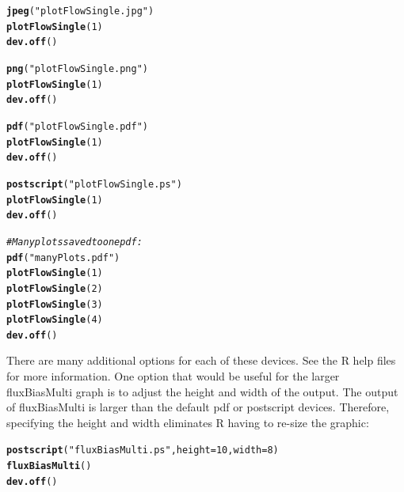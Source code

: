 \documentclass[a4paper,11pt]{article}\usepackage[]{graphicx}\usepackage[]{color}
\makeatletter
\newcommand{\hlnum}[1]{\textcolor[rgb]{0.686,0.059,0.569}{#1}}%
\newcommand{\hlstr}[1]{\textcolor[rgb]{0.192,0.494,0.8}{#1}}%
\newcommand{\hlcom}[1]{\textcolor[rgb]{0.678,0.584,0.686}{\textit{#1}}}%
\newcommand{\hlstd}[1]{\textcolor[rgb]{0.345,0.345,0.345}{#1}}%
\newcommand{\hlkwc}[1]{\textcolor[rgb]{0.333,0.667,0.333}{#1}}%
\newcommand{\hlkwd}[1]{\textcolor[rgb]{0.737,0.353,0.396}{\textbf{#1}}}%
\newenvironment{kframe}{%
 \def\at@end@of@kframe{}%
 \ifinner\ifhmode%
  \def\at@end@of@kframe{\end{minipage}}%
  \begin{minipage}{\columnwidth}%
 \fi\fi%
 \def\FrameCommand##1{\hskip\@totalleftmargin \hskip-\fboxsep
 \colorbox{shadecolor}{##1}\hskip-\fboxsep
     \hskip-\linewidth \hskip-\@totalleftmargin \hskip\columnwidth}%
 \MakeFramed {\advance\hsize-\width
   \@totalleftmargin\z@ \linewidth\hsize
   \@setminipage}}%
 {\par\unskip\endMakeFramed%
 \at@end@of@kframe}
\newenvironment{knitrout}{}{} %
\makeatother
\begin{document}
\begin{knitrout}
\color{fgcolor}\begin{kframe}
\begin{alltt}
\hlkwd{jpeg}\hlstd{(}\hlstr{"plotFlowSingle.jpg"}\hlstd{)}
\hlkwd{plotFlowSingle}\hlstd{(}\hlnum{1}\hlstd{)}
\hlkwd{dev.off}\hlstd{()}

\hlkwd{png}\hlstd{(}\hlstr{"plotFlowSingle.png"}\hlstd{)}
\hlkwd{plotFlowSingle}\hlstd{(}\hlnum{1}\hlstd{)}
\hlkwd{dev.off}\hlstd{()}

\hlkwd{pdf}\hlstd{(}\hlstr{"plotFlowSingle.pdf"}\hlstd{)}
\hlkwd{plotFlowSingle}\hlstd{(}\hlnum{1}\hlstd{)}
\hlkwd{dev.off}\hlstd{()}

\hlkwd{postscript}\hlstd{(}\hlstr{"plotFlowSingle.ps"}\hlstd{)}
\hlkwd{plotFlowSingle}\hlstd{(}\hlnum{1}\hlstd{)}
\hlkwd{dev.off}\hlstd{()}

\hlcom{#Many plots saved to one pdf:}
\hlkwd{pdf}\hlstd{(}\hlstr{"manyPlots.pdf"}\hlstd{)}
\hlkwd{plotFlowSingle}\hlstd{(}\hlnum{1}\hlstd{)}
\hlkwd{plotFlowSingle}\hlstd{(}\hlnum{2}\hlstd{)}
\hlkwd{plotFlowSingle}\hlstd{(}\hlnum{3}\hlstd{)}
\hlkwd{plotFlowSingle}\hlstd{(}\hlnum{4}\hlstd{)}
\hlkwd{dev.off}\hlstd{()}
\end{alltt}
\end{kframe}
\end{knitrout}


There are many additional options for each of these devices. See the R help files for more information. One option that would be useful for the larger fluxBiasMulti graph is to adjust the height and width of the output. The output of fluxBiasMulti is larger than the default pdf or postscript devices. Therefore, specifying the height and width eliminates R having to re-size the graphic:

\begin{knitrout}
\color{fgcolor}\begin{kframe}
\begin{alltt}
\hlkwd{postscript}\hlstd{(}\hlstr{"fluxBiasMulti.ps"}\hlstd{,} \hlkwc{height}\hlstd{=}\hlnum{10}\hlstd{,}\hlkwc{width}\hlstd{=}\hlnum{8}\hlstd{)}
\hlkwd{fluxBiasMulti}\hlstd{()}
\hlkwd{dev.off}\hlstd{()}
\end{alltt}
\end{kframe}
\end{knitrout}
\end{document}
